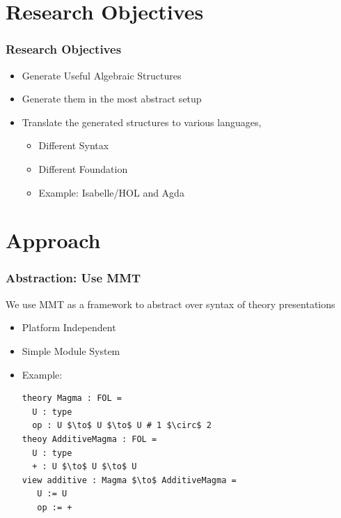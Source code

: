 \documentclass[t,12pt,numbers,fleqn,usenames,xcolor=dvipsnames]{beamer}
\begin{document}
\section{Research Objectives}
\begin{frame}
\frametitle{Research Objectives}
\begin{itemize}
	\item Generate Useful Algebraic Structures 
	\item Generate them in the most abstract setup 
	\item Translate the generated structures to various languages, 
	  \begin{itemize}
	  	\item Different Syntax
	  	\item Different Foundation 
	  	\item Example: Isabelle/HOL and Agda 
	  \end{itemize}
\end{itemize}
\end{frame}

\section{Approach}
\begin{frame}[fragile]
\frametitle{Abstraction: Use MMT}
We use MMT as a framework to abstract over syntax of theory presentations 
\begin{itemize}
	\item Platform Independent 
	\item Simple Module System
	\item Example: 
\scriptsize	
	\begin{lstlisting}
theory Magma : FOL = 
  U : type
  op : U $\to$ U $\to$ U # 1 $\circ$ 2
theoy AdditiveMagma : FOL = 
  U : type
  + : U $\to$ U $\to$ U 
view additive : Magma $\to$ AdditiveMagma = 
   U := U 
   op := +   
	\end{lstlisting}
\end{itemize}
\end{frame}

\end{document}
